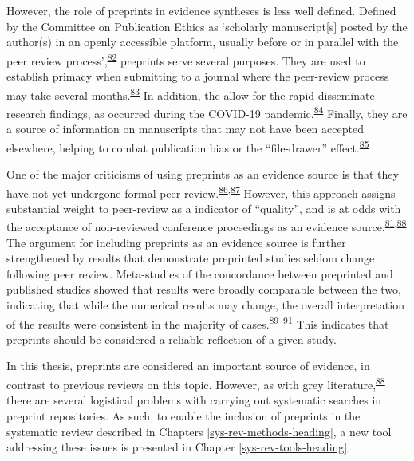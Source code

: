 \documentclass[a4paper, twoside]{templates/ociamthesis}
\begin{document}
However, the role of preprints in evidence syntheses is less well defined. Defined by the Committee on Publication Ethics as `scholarly manuscript{[}s{]} posted by the author(s) in an openly accessible platform, usually before or in parallel with the peer review process',\textsuperscript{\protect\hyperlink{ref-committeeonpublicationethicscope2018}{82}} preprints serve several purposes. They are used to establish primacy when submitting to a journal where the peer-review process may take several months.\textsuperscript{\protect\hyperlink{ref-vale2016}{83}} In addition, the allow for the rapid disseminate research findings, as occurred during the COVID-19 pandemic.\textsuperscript{\protect\hyperlink{ref-fraser2020preprinting}{84}} Finally, they are a source of information on manuscripts that may not have been accepted elsewhere, helping to combat publication bias or the ``file-drawer'' effect.\textsuperscript{\protect\hyperlink{ref-rosenthal1979}{85}}

One of the major criticisms of using preprints as an evidence source is that they have not yet undergone formal peer review.\textsuperscript{\protect\hyperlink{ref-maslove2018}{86},\protect\hyperlink{ref-schalkwyk2020}{87}} However, this approach assigns substantial weight to peer-review as a indicator of ``quality'', and is at odds with the acceptance of non-reviewed conference proceedings as an evidence source.\textsuperscript{\protect\hyperlink{ref-lefebvre2019searching}{81},\protect\hyperlink{ref-mahood2014}{88}} The argument for including preprints as an evidence source is further strengthened by results that demonstrate preprinted studies seldom change following peer review. Meta-studies of the concordance between preprinted and published studies showed that results were broadly comparable between the two, indicating that while the numerical results may change, the overall interpretation of the results were consistent in the majority of cases.\textsuperscript{\protect\hyperlink{ref-shi2021}{89}--\protect\hyperlink{ref-nicholson2021}{91}} This indicates that preprints should be considered a reliable reflection of a given study.

In this thesis, preprints are considered an important source of evidence, in contrast to previous reviews on this topic. However, as with grey literature,\textsuperscript{\protect\hyperlink{ref-mahood2014}{88}} there are several logistical problems with carrying out systematic searches in preprint repositories. As such, to enable the inclusion of preprints in the systematic review described in Chapters \ref{sys-rev-methods-heading}, a new tool addressing these issues is presented in Chapter \ref{sys-rev-tools-heading}.
\end{document}

